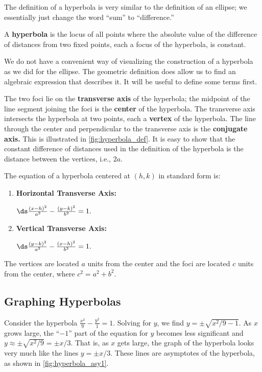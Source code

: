 The definition of a hyperbola is very similar to the definition of an ellipse; we essentially just change the word ``sum'' to ``difference.''

{A \textbf{hyperbola} is the locus of all points where the absolute value of the difference of distances from two fixed points, each a focus of the hyperbola, is constant.
}

We do not have a convenient way of visualizing the construction of a hyperbola as we did for the ellipse. The geometric definition does allow us to find an algebraic expression that describes it. It will be useful to define some terms first.

The two foci lie on the \textbf{transverse axis} of the hyperbola; the midpoint of the line segment joining the foci is the \textbf{center} of the hyperbola. The transverse axis intersects the hyperbola at two points, each a \textbf{vertex} of the hyperbola. The line through the center and perpendicular to the transverse axis is the \textbf{conjugate axis.} This is illustrated in \autoref{fig:hyperbola_def}. It is easy to show that the constant difference of distances used in the definition of the hyperbola is the distance between the vertices, i.e., $2a$.

{The equation of a hyperbola centered at $(h,k)$ in standard form is:
\begin{enumerate}
	\item \parbox{120pt}{\textbf{Horizontal Transverse Axis:}} $\ds \frac{(x-h)^2}{a^2} - \frac{(y-k)^2}{b^2} = 1.$
	\item	\parbox{120pt}{\textbf{Vertical Transverse Axis:}} $\ds \frac{(y-k)^2}{a^2}-\frac{(x-h)^2}{b^2} = 1.$
\end{enumerate}
The vertices are located $a$ units from the center and the foci are located $c$ units from the center, where $c^2 = a^2+b^2$.}

\subsection*{Graphing Hyperbolas}

Consider the hyperbola $\frac{x^2}9-\frac{y^2}1 = 1$. Solving for $y$, we find $y=\pm\sqrt{x^2/9-1}$. As $x$ grows large, the ``$-1$'' part of the equation for $y$ becomes less significant and $y\approx \pm\sqrt{x^2/9} = \pm x/3$. That is, as $x$ gets large, the graph of the hyperbola looks very much like the lines $y=\pm x/3$. These lines are asymptotes of the hyperbola, as shown in \autoref{fig:hyperbola_asy1}.


